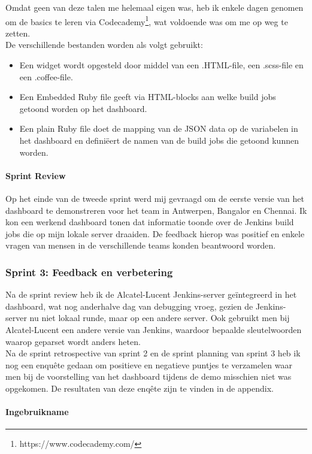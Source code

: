 \documentclass[10pt,a4paper]{article}
\begin{document}
Omdat geen van deze talen me helemaal eigen was, heb ik enkele dagen genomen om de basics te leren via Codecademy\footnote{https://www.codecademy.com/}, wat voldoende was om me op weg te zetten.\\
De verschillende bestanden worden als volgt gebruikt:
\begin{itemize}
\item Een widget wordt opgesteld door middel van een .HTML-file, een .scss-file en een .coffee-file.
\item Een Embedded Ruby file geeft via HTML-blocks aan welke build jobs getoond worden op het dashboard.
\item Een plain Ruby file doet de mapping van de JSON data op de variabelen in het dashboard en defini\"eert de namen van de build jobs die getoond kunnen worden.
\end{itemize}
\paragraph{Sprint Review} Op het einde van de tweede sprint werd mij gevraagd om de eerste versie van het dashboard te demonstreren voor het team in Antwerpen, Bangalor en Chennai. Ik kon een werkend dashboard tonen dat informatie toonde over de Jenkins build jobs die op mijn lokale server draaiden. De feedback hierop was positief en enkele vragen van mensen in de verschillende teams konden beantwoord worden. 
\subsubsection{Sprint 3: Feedback en verbetering}
\label{sprint3}
Na de sprint review heb ik de Alcatel-Lucent Jenkins-server ge\"integreerd in het dashboard, wat nog anderhalve dag van debugging vroeg, gezien de Jenkins-server nu niet lokaal runde, maar op een andere server. Ook gebruikt men bij Alcatel-Lucent een andere versie van Jenkins, waardoor bepaalde sleutelwoorden waarop geparset wordt anders heten.\\
Na de sprint retrospective van sprint 2 en de sprint planning van sprint 3 heb ik nog een enqu\^ete gedaan om positieve en negatieve puntjes te verzamelen waar men bij de voorstelling van het dashboard tijdens de demo misschien niet was opgekomen. De resultaten van deze enq\^ete zijn te vinden in de appendix.
\paragraph{Ingebruikname} 
\end{document}

